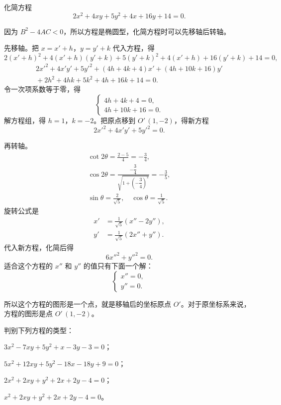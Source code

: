 \begin{example}
  化简方程
  \[2x^2+4xy+5y^2+4x+16y+14=0.\]
\end{example}
\begin{solution}
  因为 $B^2-4AC<0$，所以方程是椭圆型，化简方程时可以先移轴后转轴。

  先移轴。把 $x=x'+h$，$y =y'+k$ 代入方程，得
  \[2(x'+h)^2+ 4(x'+h)(y'+k)+5(y'+k)^2+4(x'+h)+16(y'+k)+14=0,\]
  \begin{multline*}
    2x'^2+4x'y'+5y'^2+(4h+4k+4)x'+(4h+10k+16)y'\\ {}+2h^2+4hk+5k^2+4h+16k+14=0.
  \end{multline*}
  令一次项系数等于零，得
  \[\begin{cases}
    4h+4k+4=0,\\4h+10k+16=0.
  \end{cases}\]
  解方程组，得 $h=1$，$k=-2$。把原点移到 $O'\,(1,-2)$，得新方程
  \[ 2x'^2+4x'y'+5y'^2=0.\]

  再转轴。
  \begin{gather*}
    \cot2\theta=\frac{2-5}{4}= -\frac{3}{4},\\
    \cos2\theta=\frac{-\dfrac{3}{4}}{\sqrt{1+\left(-\dfrac{3}{4}\right)^2}}=-\frac{3}{5},\\
    \sin\theta=\frac{2}{\sqrt{5}},\quad\cos\theta=\frac{1}{\sqrt{5}}.
  \end{gather*}
  旋转公式是
  \begin{align*}
    x'&=\frac{1}{\sqrt{5}}(x''-2y''),\\
    y'&=\frac{1}{\sqrt{5}}(2x''+y'').
  \end{align*}
  代入新方程，化简后得
  \[ 6x''^2+y''^2=0.\]
  适合这个方程的 $x''$ 和 $y''$ 的值只有下面一个解：
  \[\begin{cases}x''=0,\\y''=0.\end{cases}\]

  所以这个方程的图形是一个点，就是移轴后的坐标原点 $O'$。对于原坐标系来说，方程的图形是点 $O'\,(1,-2)$。
\end{solution}

\begin{Practice}
  判别下列方程的类型：
  \begin{question}
    \item $3x^2-7xy+5y^2+x-3y-3=0$；
    \item $5x^2+12xy+5y^2-18x-18y+9=0$；
    \item $2x^2+2xy+y^2+2x+2y-4=0$；
    \item $x^2+2xy+y^2+2x+2y-4=0$。
  \end{question}
\end{Practice}

